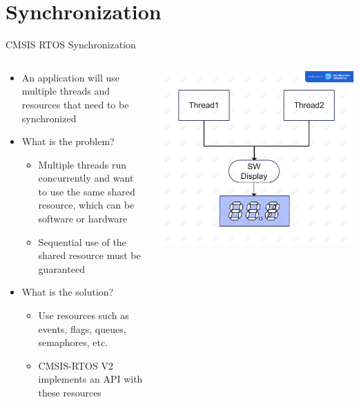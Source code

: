 \section{Synchronization}
\begin{frame}{CMSIS RTOS Synchronization}
    \begin{columns}
        \begin{column}{0.50\textwidth}
            \begin{itemize}
                \item An application will use multiple threads and resources that need to be synchronized
                \item What is the problem?
                    \begin{itemize}
                        \item Multiple threads run concurrently and want to use the same shared resource, which can be software or hardware
                        \item Sequential use of the shared resource must be guaranteed
                    \end{itemize}
                \item What is the solution?
                \begin{itemize}
                    \item Use resources such as events, flags, queues, semaphores, etc.
                    \item CMSIS-RTOS V2 implements an API with these resources
                \end{itemize}
            \end{itemize}
        \end{column}
        \begin{column}{0.50\textwidth}
            \includegraphics[scale=0.05]{presentation/threads.jpg}
        \end{column}
    \end{columns}
\end{frame}
